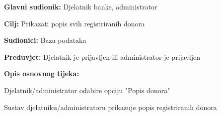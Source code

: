 \eject 
\noindent {}
					\begin{packed_item}
	
						\item \textbf{Glavni sudionik: }Djelatnik banke, administrator
						\item \textbf{Cilj:} Prikazati popis svih registriranih donora
						\item \textbf{Sudionici:} Baza podataka
						\item \textbf{Preduvjet:} Djelatnik je prijavljen ili administrator je prijavljen
						\item \textbf{Opis osnovnog tijeka:}
						
						\item[] \begin{packed_enum}
	
							\item Djelatnik/administrator odabire opciju "Popis donora"
							\item Sustav djelatniku/administratoru prikazuje popis registriranih donora
						\end{packed_enum}

					\end{packed_item}



